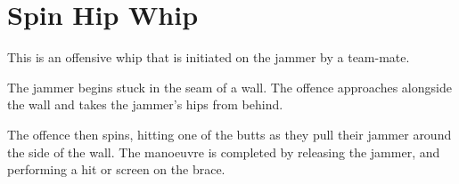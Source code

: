\section{Spin Hip Whip}
\label{sec:whips/spin_hip_whip} 

This is an offensive whip that is initiated on the jammer by a team-mate.


The jammer begins stuck in the seam of a wall.
The offence approaches alongside the wall and takes the jammer's hips from behind.

The offence then spins, hitting one of the butts as they pull their jammer around the side of the wall. 
The manoeuvre is completed by releasing the jammer, and performing a hit or screen on the brace.  
